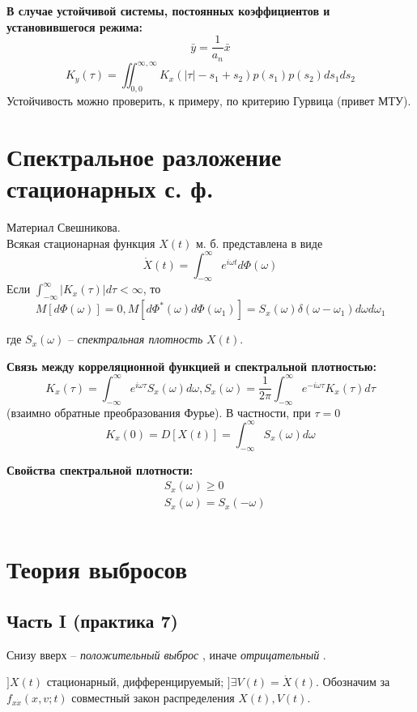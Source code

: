 \documentclass[a4paper,11pt, twocolumn]{article}
\begin{document}
\textbf{ В случае устойчивой системы, постоянных коэффициентов и установившегося режима: }
\[ \bar y = \frac{1}{a_n} \bar x \]
\[ K_y(\tau) = \iint_{0,0}^{\infty, \infty} K_x(|\tau| - s_1 + s_2) p(s_1)p(s_2) ds_1 ds_2 \]
Устойчивость можно проверить, к примеру, по критерию Гурвица (привет МТУ).

\section{ Спектральное разложение стационарных с. ф. }
Материал  Свешникова. \\

Всякая стационарная функция $ X(t) $ м. б. представлена в виде
\[ \mathring X(t) = \int_{-\infty}^{\infty} e^{i\omega t} d \Phi(\omega) \]
Если $ \int_{-\infty}^{\infty} |K_x(\tau)| d\tau < \infty $, то
\[ M[d \Phi(\omega)] = 0, M[d \Phi^*(\omega) d\Phi(\omega_1)] = S_x(\omega) \delta(\omega - \omega_1) d \omega d \omega_1 \]

где $ S_x(\omega) $ -- \emph{ спектральная плотность } $ X(t) $.

\textbf{ Связь между корреляционной функцией и спектральной плотностью: }
\[ K_x(\tau) = \int_{-\infty}^{\infty} e^{i \omega \tau} S_x(\omega) d \omega, S_x(\omega) = \frac{1}{2 \pi} \int_{-\infty}^{\infty} e^{- i \omega \tau} K_x(\tau) d\tau \]
(взаимно обратные преобразования Фурье).
В частности, при $ \tau = 0 $
\[ K_x(0) = D[X(t)] = \int_{-\infty}^{\infty} S_x(\omega) d \omega \]

\textbf{ Свойства спектральной плотности: }
\begin{align*}
    & S_x(\omega) \ge 0 \\
    & S_x(\omega) = S_x(-\omega) \\
    & \\
\end{align*}


\section{ Теория выбросов }

\subsection{ Часть I (практика 7) }

Снизу вверх -- \emph{ положительный выброс }, иначе \emph{ отрицательный }.

$ ] X(t) $ стационарный, дифференцируемый; $ ] \exists V(t) = \dot X(t) $.
Обозначим за $ f_{x \dot x}(x,v;t) $ совместный закон распределения $ X(t), V(t) $.
\end{document}
